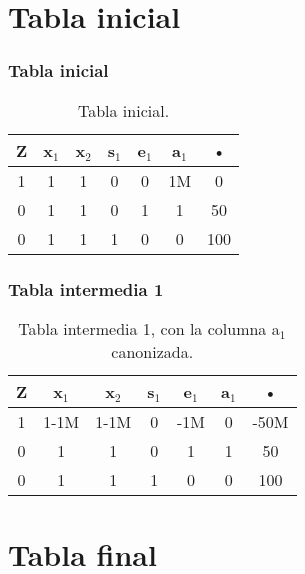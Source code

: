 \documentclass{beamer}
\begin{document}
\section{Tabla inicial} 
 
\begin{frame}  
\frametitle{Tabla inicial} 
\begin{table}[H] 
\begin{center} 
\begin{tabular}{|*{7}{c|}} 
\hline 
\textbf{Z}  & \textbf{x$_{1}$} & \textbf{x$_{2}$} & \textbf{s$_{1}$} & \textbf{e$_{1}$} & \textbf{a$_{1}$} & \textbf{•} \\\hline \hline 
1 & 1 & 1 & 0 & 0 & 1M & 0 \\\hline 
0 & 1 & 1 & 0 & 1 & 1 & 50\\ 
\hline 
0 & 1 & 1 & 1 & 0 & 0 & 100\\ 
\hline 
\end{tabular} 
\caption{Tabla inicial.} 
\end{center} 
\end{table} 
\end{frame} 
 
 
\begin{frame}  
\frametitle{Tabla intermedia 1} 
\begin{table}[H] 
\begin{center} 
\begin{tabular}{|*{7}{c|}} 
\hline 
\textbf{Z}  & \textbf{x$_{1}$} & \textbf{x$_{2}$} & \textbf{s$_{1}$} & \textbf{e$_{1}$} & \textbf{a$_{1}$} & \textbf{•} \\\hline \hline 
1 & 1-1M & 1-1M & 0 & -1M & 0 & -50M \\\hline 
0 & 1 & 1 & 0 & 1 & 1 & 50\\ 
\hline 
0 & 1 & 1 & 1 & 0 & 0 & 100\\ 
\hline 
\end{tabular} 
\caption{Tabla intermedia 1, con la columna a$_{1}$ canonizada.} 
\end{center} 
\end{table} 
\end{frame} 
 
\section{Tabla final} 
 
\end{document}
